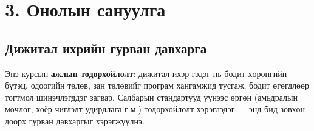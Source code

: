 \hypertarget{ux43eux43dux43eux43bux44bux43d-ux441ux430ux43dux443ux443ux43bux433ux430}{%
\section{3. Онолын сануулга}\label{ux43eux43dux43eux43bux44bux43d-ux441ux430ux43dux443ux443ux43bux433ux430}}

\hypertarget{ux434ux438ux436ux438ux442ux430ux43b-ux438ux445ux440ux438ux439ux43d-ux433ux443ux440ux432ux430ux43d-ux434ux430ux432ux445ux430ux440ux433ux430}{%
\subsection{Дижитал ихрийн гурван давхарга}\label{ux434ux438ux436ux438ux442ux430ux43b-ux438ux445ux440ux438ux439ux43d-ux433ux443ux440ux432ux430ux43d-ux434ux430ux432ux445ux430ux440ux433ux430}}

Энэ курсын \textbf{ажлын тодорхойлолт}: дижитал ихэр гэдэг нь бодит хөрөнгийн бүтэц, одоогийн төлөв, зан төлөвийг програм хангамжид тусгаж, бодит өгөгдлөөр тогтмол шинэчлэгддэг загвар. Салбарын стандартууд үүнээс өргөн (амьдралын мөчлөг, хоёр чиглэлт удирдлага г.м.) тодорхойлолт хэрэглэдэг --- энд бид зөвхөн доорх гурван давхаргыг хэрэгжүүлнэ.

